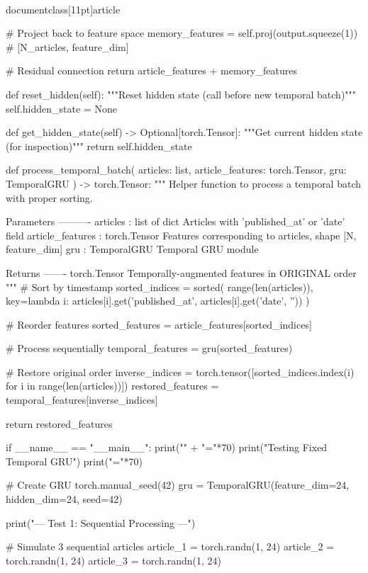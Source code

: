 \\documentclass[11pt]{article}
\begin{document}
\begin{CodeBlock}
        # Project back to feature space
        memory_features = self.proj(output.squeeze(1))  # [N_articles, feature_dim]
        
        # Residual connection
        return article_features + memory_features
    
    def reset_hidden(self):
        """Reset hidden state (call before new temporal batch)"""
        self.hidden_state = None
    
    def get_hidden_state(self) -> Optional[torch.Tensor]:
        """Get current hidden state (for inspection)"""
        return self.hidden_state


def process_temporal_batch(
    articles: list,
    article_features: torch.Tensor,
    gru: TemporalGRU
) -> torch.Tensor:
    """
    Helper function to process a temporal batch with proper sorting.
    
    Parameters
    ----------
    articles : list of dict
        Articles with 'published_at' or 'date' field
    article_features : torch.Tensor
        Features corresponding to articles, shape [N, feature_dim]
    gru : TemporalGRU
        Temporal GRU module
    
    Returns
    -------
    torch.Tensor
        Temporally-augmented features in ORIGINAL order
    """
    # Sort by timestamp
    sorted_indices = sorted(
        range(len(articles)),
        key=lambda i: articles[i].get('published_at', articles[i].get('date', ''))
    )
    
    # Reorder features
    sorted_features = article_features[sorted_indices]
    
    # Process sequentially
    temporal_features = gru(sorted_features)
    
    # Restore original order
    inverse_indices = torch.tensor([sorted_indices.index(i) for i in range(len(articles))])
    restored_features = temporal_features[inverse_indices]
    
    return restored_features


if __name__ == "__main__":
    print("\n" + "="*70)
    print("Testing Fixed Temporal GRU")
    print("="*70)
    
    # Create GRU
    torch.manual_seed(42)
    gru = TemporalGRU(feature_dim=24, hidden_dim=24, seed=42)
    
    print("\n--- Test 1: Sequential Processing ---")
    
    # Simulate 3 sequential articles
    article_1 = torch.randn(1, 24)
    article_2 = torch.randn(1, 24)
    article_3 = torch.randn(1, 24)
    

\end{CodeBlock}
\end{document}
